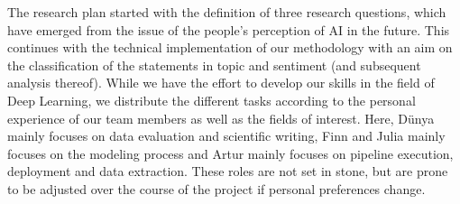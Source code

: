 \documentclass[11pt]{article}
\begin{document}
The research plan started with the definition of three research questions, which have emerged from the issue of the people’s perception of AI in the future. This continues with the technical implementation of our methodology with an aim on the classification of the statements in topic and sentiment (and subsequent analysis thereof). While we have the effort to develop our skills in the field of Deep Learning, we distribute the different tasks according to the personal experience of our team members as well as the fields of interest. Here, Dünya mainly focuses on data evaluation and scientific writing, Finn and Julia mainly focuses on the modeling process and Artur  mainly focuses on pipeline execution, deployment and data extraction. These roles are not set in stone, but are prone to be adjusted over the course of the project if personal preferences change.
\end{document}

